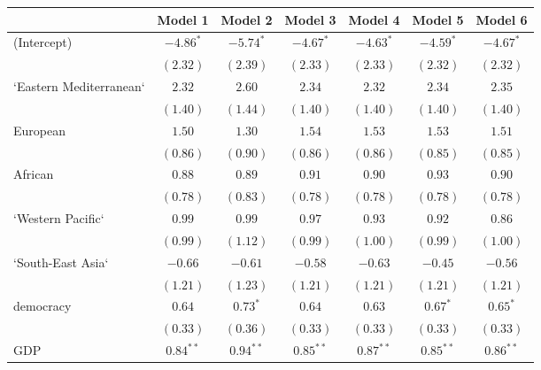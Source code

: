 
\begin{table}[!h]
\begin{center}
\begin{tabular}{l c c c c c c }
\toprule
 & Model 1 & Model 2 & Model 3 & Model 4 & Model 5 & Model 6 \\
\midrule
(Intercept)             & $-4.86^{*}$  & $-5.74^{*}$  & $-4.67^{*}$  & $-4.63^{*}$  & $-4.59^{*}$  & $-4.67^{*}$  \\
                        & $(2.32)$     & $(2.39)$     & $(2.33)$     & $(2.33)$     & $(2.32)$     & $(2.32)$     \\
`Eastern Mediterranean` & $2.32$       & $2.60$       & $2.34$       & $2.32$       & $2.34$       & $2.35$       \\
                        & $(1.40)$     & $(1.44)$     & $(1.40)$     & $(1.40)$     & $(1.40)$     & $(1.40)$     \\
European                & $1.50$       & $1.30$       & $1.54$       & $1.53$       & $1.53$       & $1.51$       \\
                        & $(0.86)$     & $(0.90)$     & $(0.86)$     & $(0.86)$     & $(0.85)$     & $(0.85)$     \\
African                 & $0.88$       & $0.89$       & $0.91$       & $0.90$       & $0.93$       & $0.90$       \\
                        & $(0.78)$     & $(0.83)$     & $(0.78)$     & $(0.78)$     & $(0.78)$     & $(0.78)$     \\
`Western Pacific`       & $0.99$       & $0.99$       & $0.97$       & $0.93$       & $0.92$       & $0.86$       \\
                        & $(0.99)$     & $(1.12)$     & $(0.99)$     & $(1.00)$     & $(0.99)$     & $(1.00)$     \\
`South-East Asia`       & $-0.66$      & $-0.61$      & $-0.58$      & $-0.63$      & $-0.45$      & $-0.56$      \\
                        & $(1.21)$     & $(1.23)$     & $(1.21)$     & $(1.21)$     & $(1.21)$     & $(1.21)$     \\
democracy               & $0.64$       & $0.73^{*}$   & $0.64$       & $0.63$       & $0.67^{*}$   & $0.65^{*}$   \\
                        & $(0.33)$     & $(0.36)$     & $(0.33)$     & $(0.33)$     & $(0.33)$     & $(0.33)$     \\
GDP                     & $0.84^{**}$  & $0.94^{**}$  & $0.85^{**}$  & $0.87^{**}$  & $0.85^{**}$  & $0.86^{**}$  \\

\end{tabular}
\end{center}
\end{table}
